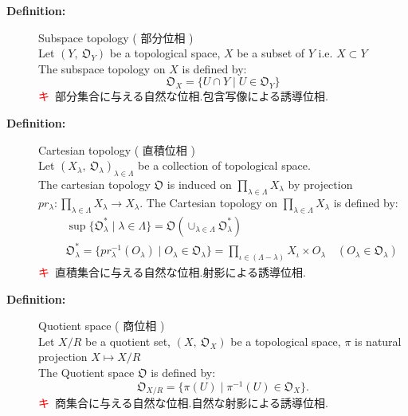 \documentclass[english,dvipdfmx]{jsarticle}
\newcommand*{\point}{\textcircled{\textcolor{red}{\scriptsize キ}}}
\begin{document}
\begin{description}
    \item[\bf{Definition:}]  Subspace topology ( 部分位相 )\\
        Let $( Y,\ \mathfrak{O}_Y)$ be a topological space, $X$ be a subset of $Y$ i.e. $X \subset Y$ \\
        The subspace topology on $X$ is defined by:
        $$\mathfrak{O}_{X} = \{ U \cap Y \mid U \in \mathfrak{O}_{Y} \}$$
        \point \ 部分集合に与える自然な位相.包含写像による誘導位相.

    \item[\bf{Definition:}] Cartesian topology ( 直積位相 )\\
        Let $( X_{\lambda},\ \mathfrak{O}_{\lambda} )_{\lambda \in \Lambda}$ be a collection of topological space. \\
        The cartesian topology $\mathfrak{O}$ is induced on $\prod_{\lambda \in \Lambda} X_{\lambda}$ by projection $pr_{\lambda} : \prod_{\lambda \in \Lambda} X_{\lambda} \rightarrow X_{\lambda}$.
        The Cartesian topology on $\prod_{\lambda \in \Lambda} X_{\lambda}$ is defined by:
        \begin{eqnarray*}
        & & \sup \{ \mathfrak{O}_{\lambda}^* \mid \lambda \in \Lambda \} = \mathfrak{O}(\cup_{\lambda \in \Lambda} \mathfrak{O}_{\lambda}^*) \\
        & & \mathfrak{O}_{\lambda}^* = \{ pr_{\lambda}^{-1} (O_{\lambda}) \mid O_{\lambda} \in \mathfrak{O}_{\lambda} \} = \prod_{ \iota \in (\Lambda - \lambda)  } X_{\iota} \times O_{\lambda} \quad (O_{\lambda} \in \mathfrak{O}_{\lambda}) 
        \end{eqnarray*}
        \point \ 直積集合に与える自然な位相.射影による誘導位相.
    
    \item[\bf{Definition:}] Quotient space ( 商位相 )\\
        Let $X / R$ be a quotient set, $( X,\ \mathfrak{O}_{X})$ be a topological space, $\pi$ is natural projection $X \mapsto X / R$ \\
        The Quotient space $\mathfrak{O}$ is defined by:
        $$\mathfrak{O}_{X/R} = \{ \pi (U) \mid \pi^{-1}(U) \in \mathfrak{O}_{X}\}.$$
        \point \ 商集合に与える自然な位相.自然な射影による誘導位相.
    

\end{description}
\end{document}
